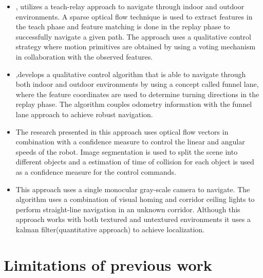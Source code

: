 	\begin{itemize}
	\item \cite{chen2006qualitative}, utilizes a teach-relay approach to navigate through indoor and outdoor environments. A sparse optical flow technique is used to extract features in the teach phase and feature matching is done in the replay phase to successfully navigate a given path. The approach uses a qualitative control strategy where motion primitives are obtained by using a voting mechanism in collaboration with the observed features.
	
	\item \cite{chen2009qualitative},develops a qualitative control algorithm that is able to navigate through both indoor and outdoor environments by using a concept called funnel lane, where the feature coordinates are used to determine turning directions in the replay phase. The algorithm couples odometry information with the funnel lane approach to achieve robust navigation.
	
	\item \cite{sarcinelli2002using} The research presented in this approach uses optical flow vectors in combination with a confidence measure to control the linear and angular speeds of the robot. Image segmentation is used to split the scene into different objects and a estimation of time of collision for each object is used as a confidence measure for the control commands.
	
	\item \cite{murali2008autonomous} This approach uses a single monocular gray-scale camera to navigate. The algorithm uses a combination of visual homing and corridor ceiling lights to perform straight-line navigation in an unknown corridor. Although this approach works with both textured and untextured environments it uses a kalman filter(quantitative approach) to achieve localization.

\end{itemize}

\section{Limitations of previous work}

